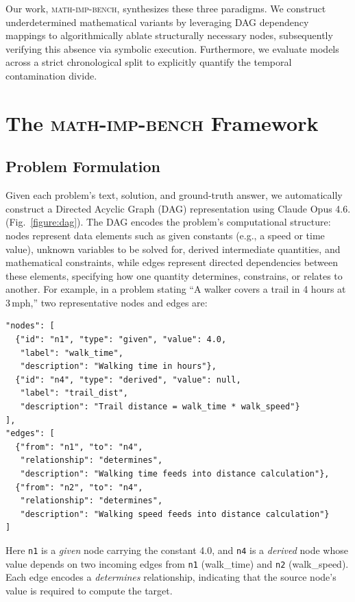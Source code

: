 \documentclass{article} %
\newcommand{\benchname}{\textsc{math-imp-bench}}
\begin{document}
Our work, \benchname{}, synthesizes these three paradigms. We construct underdetermined mathematical variants by leveraging DAG dependency mappings to algorithmically ablate structurally necessary nodes, subsequently verifying this absence via symbolic execution. Furthermore, we evaluate models across a strict chronological split to explicitly quantify the temporal contamination divide.


\section{The \benchname{} Framework}
\label{sec:framework}

\subsection{Problem Formulation}
\label{sec:dag}

Given each problem's text, solution, and ground-truth answer, we automatically construct a Directed Acyclic Graph (DAG) representation using Claude Opus 4.6. (Fig.~\ref{figure:dag}). The DAG encodes the problem's computational structure: nodes represent data elements such as given constants (e.g., a speed or time value), unknown variables to be solved for, derived intermediate quantities, and mathematical constraints, while edges represent directed dependencies between these elements, specifying how one quantity determines, constrains, or relates to another. For example, in a problem stating ``A walker covers a trail in 4 hours at 3\,mph,'' two representative nodes and edges are:

\begin{verbatim}
"nodes": [
  {"id": "n1", "type": "given", "value": 4.0,
   "label": "walk_time",
   "description": "Walking time in hours"},
  {"id": "n4", "type": "derived", "value": null,
   "label": "trail_dist",
   "description": "Trail distance = walk_time * walk_speed"}
],
"edges": [
  {"from": "n1", "to": "n4",
   "relationship": "determines",
   "description": "Walking time feeds into distance calculation"},
  {"from": "n2", "to": "n4",
   "relationship": "determines",
   "description": "Walking speed feeds into distance calculation"}
]
\end{verbatim}

Here \texttt{n1} is a \textit{given} node carrying the constant 4.0, and \texttt{n4} is a \textit{derived} node whose value depends on two incoming edges from \texttt{n1} (walk\_time) and \texttt{n2} (walk\_speed). Each edge encodes a \textit{determines} relationship, indicating that the source node's value is required to compute the target.
\end{document}
